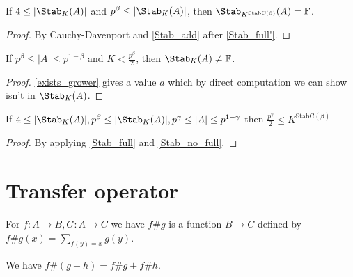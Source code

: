 \begin{lemma}
    \label{Stab_full}
    \leanok
    If $4 \leq |\Stab_K(A)|$ and $p^\beta \leq |\Stab_K(A)|$,
    then $\Stab_{K^{\mathrm{StabC}(\beta)}} (A) = \mathbb{F}$.
\end{lemma}

\begin{proof}
    \leanok
    By Cauchy-Davenport and \ref{Stab_add} after \ref{Stab_full'}.
\end{proof}

\begin{lemma}
    \label{Stab_no_full}
    \leanok
    If $p^\beta \leq |A| \leq p^{1 - \beta}$ and $K < \frac{p^\beta}2$, then
    $\Stab_K(A) \neq \mathbb{F}$.
\end{lemma}

\begin{proof}
    \leanok
    \ref{exists_grower} gives a value $a$ which by direct computation we can show isn't in $\Stab_K(A)$.
\end{proof}

\begin{lemma}
    \label{Stab_small}
    \leanok
    If $4 \leq |\Stab_K(A)|, p^\beta \leq |\Stab_K(A)|, p^\gamma \leq |A| \leq p^{1 - \gamma}$
    then $\frac{p^\gamma}2 \leq K^{\mathrm{StabC}(\beta)}$
\end{lemma}

\begin{proof}
    \leanok
    By applying \ref{Stab_full} and \ref{Stab_no_full}.
\end{proof}

\chapter{Transfer operator}
\label{chap:transfer}

\begin{definition}
    \label{transfer}
    \leanok
    For $f : A \to B, G : A \to C$ we have $f \# g$ is a function $B \to C$ defined by
    $f \# g(x) = \sum_{f(y) = x}g(y)$.
\end{definition}

\begin{proposition}
    \label{transfer_add}
    \leanok
    We have $f \# (g + h) = f \# g + f \# h$.
\end{proposition}

